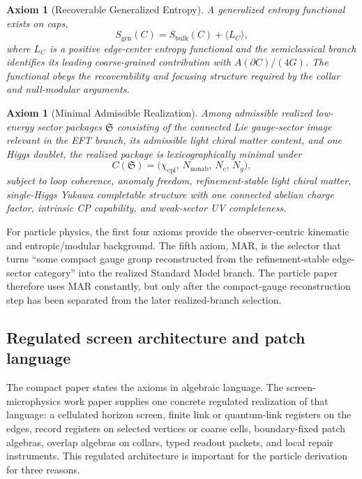 \documentclass[11pt]{article}
\newtheorem{axiom}[theorem]{Axiom}
\begin{document}
\begin{axiom}[Recoverable Generalized Entropy]\label{ax:entropy}
A generalized entropy functional exists on caps,
\[
S_{\mathrm{gen}}(C)=S_{\mathrm{bulk}}(C)+\langle L_C\rangle,
\]
where \(L_C\) is a positive edge-center entropy functional and the semiclassical branch
identifies its leading coarse-grained contribution with \(A(\partial C)/(4G)\). The functional
obeys the recoverability and focusing structure required by the collar and null-modular
arguments.
\end{axiom}

\begin{axiom}[Minimal Admissible Realization]\label{ax:mar}
Among admissible realized low-energy sector packages \(\mathfrak S\) consisting of the connected
Lie gauge-sector image relevant in the EFT branch, its admissible light chiral matter content,
and one Higgs doublet, the realized package is lexicographically minimal under
\[
C(\mathfrak S)=\bigl(\chi_{\mathrm{cpl}},\,N_{\mathrm{nonab}},\,N_c,\,N_g\bigr),
\]
subject to loop coherence, anomaly freedom, refinement-stable light chiral matter,
single-Higgs Yukawa completable structure with one connected abelian charge factor, intrinsic
CP capability, and weak-sector UV completeness.
\end{axiom}

For particle physics, the first four axioms provide the observer-centric kinematic and
entropic/modular background. The fifth axiom, MAR, is the selector that turns ``some compact
gauge group reconstructed from the refinement-stable edge-sector category'' into the realized
Standard Model branch. The particle paper therefore uses MAR constantly, but only after the
compact-gauge reconstruction step has been separated from the later realized-branch
selection.

\subsection{Regulated screen architecture and patch language}

The compact paper states the axioms in algebraic language. The screen-microphysics work
paper supplies one concrete regulated realization of that language: a cellulated horizon screen,
finite link or quantum-link registers on the edges, record registers on selected vertices or
coarse cells, boundary-fixed patch algebras, overlap algebras on collars, typed readout packets,
and local repair instruments. This regulated architecture is important for the particle derivation
for three reasons.
\end{document}
